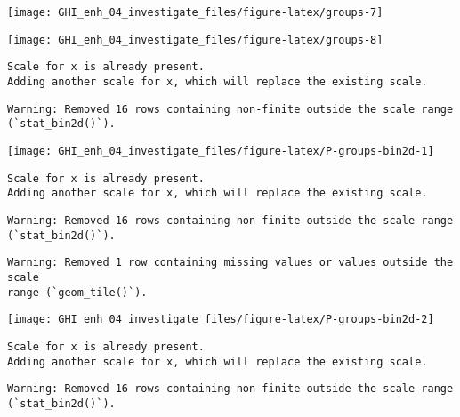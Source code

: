 \documentclass[
  10pt,
  a4paper,oneside]{article}
\begin{document}
\begin{center}\texttt{[image: GHI\_enh\_04\_investigate\_files/figure-latex/groups-7]} \end{center}

\begin{center}\texttt{[image: GHI\_enh\_04\_investigate\_files/figure-latex/groups-8]} \end{center}

\begin{verbatim}
Scale for x is already present.
Adding another scale for x, which will replace the existing scale.
\end{verbatim}

\begin{verbatim}
Warning: Removed 16 rows containing non-finite outside the scale range
(`stat_bin2d()`).
\end{verbatim}

\begin{center}\texttt{[image: GHI\_enh\_04\_investigate\_files/figure-latex/P-groups-bin2d-1]} \end{center}

\begin{verbatim}
Scale for x is already present.
Adding another scale for x, which will replace the existing scale.
\end{verbatim}

\begin{verbatim}
Warning: Removed 16 rows containing non-finite outside the scale range
(`stat_bin2d()`).
\end{verbatim}

\begin{verbatim}
Warning: Removed 1 row containing missing values or values outside the scale
range (`geom_tile()`).
\end{verbatim}

\begin{center}\texttt{[image: GHI\_enh\_04\_investigate\_files/figure-latex/P-groups-bin2d-2]} \end{center}

\begin{verbatim}
Scale for x is already present.
Adding another scale for x, which will replace the existing scale.
\end{verbatim}

\begin{verbatim}
Warning: Removed 16 rows containing non-finite outside the scale range
(`stat_bin2d()`).
\end{verbatim}
\end{document}
